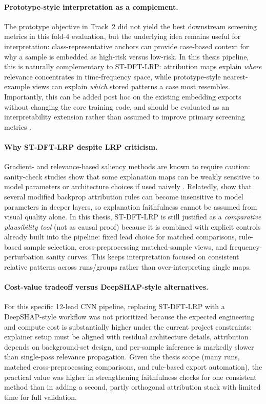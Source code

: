 \paragraph{Prototype-style interpretation as a complement.}
The prototype objective in Track~2 did not yield the best downstream screening metrics in this fold-4 evaluation, but the underlying idea remains useful for interpretation: class-representative anchors can provide case-based context for why a sample is embedded as high-risk versus low-risk.
In this thesis pipeline, this is naturally complementary to ST-DFT-LRP: attribution maps explain \emph{where} relevance concentrates in time-frequency space, while prototype-style nearest-example views can explain \emph{which} stored patterns a case most resembles.
Importantly, this can be added post hoc on the existing embedding exports without changing the core training code, and should be evaluated as an interpretability extension rather than assumed to improve primary screening metrics \parencite{ttc_2025}.

\paragraph{Why ST-DFT-LRP despite LRP criticism.}
Gradient- and relevance-based saliency methods are known to require caution: sanity-check studies show that some explanation maps can be weakly sensitive to model parameters or architecture choices if used naively \parencite{adebayo_2018_sanity,yona_2021_revisiting_sanity}.
Relatedly, \textcite{sixt_when_2020} show that several modified backprop attribution rules can become insensitive to model parameters in deeper layers, so explanation faithfulness cannot be assumed from visual quality alone.
In this thesis, ST-DFT-LRP is still justified as a \emph{comparative plausibility tool} (not as causal proof) because it is combined with explicit controls already built into the pipeline: fixed lead choice for matched comparisons, rule-based sample selection, cross-preprocessing matched-sample views, and frequency-perturbation sanity curves.
This keeps interpretation focused on consistent relative patterns across runs/groups rather than over-interpreting single maps.

\paragraph{Cost-value tradeoff versus DeepSHAP-style alternatives.}
For this specific 12-lead CNN pipeline, replacing ST-DFT-LRP with a DeepSHAP-style workflow was not prioritized because the expected engineering and compute cost is substantially higher under the current project constraints: explainer setup must be aligned with residual architecture details, attribution depends on background-set design, and per-sample inference is markedly slower than single-pass relevance propagation.
Given the thesis scope (many runs, matched cross-preprocessing comparisons, and rule-based export automation), the practical value was higher in strengthening faithfulness checks for one consistent method than in adding a second, partly orthogonal attribution stack with limited time for full validation.

